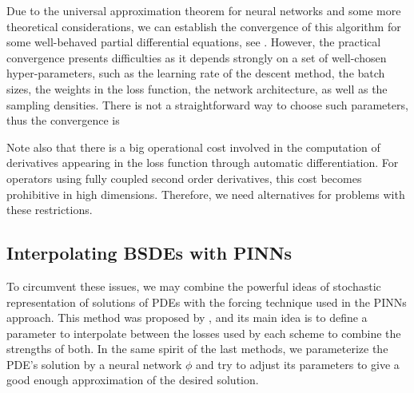 Due to the universal approximation theorem for neural networks and some more theoretical considerations, we can establish the convergence of this algorithm for some well-behaved partial differential equations, see \cite{sirignano_dgm_2018}. However, the practical convergence presents difficulties as it depends strongly on a set of well-chosen hyper-parameters, such as the learning rate of the descent method, the batch sizes, the weights in the loss function, the network architecture, as well as the sampling densities. There is not a straightforward way to choose such parameters, thus the convergence is 

Note also that there is a big operational cost involved in the computation of derivatives appearing in the loss function through automatic differentiation. For operators using fully coupled second order derivatives, this cost becomes prohibitive in high dimensions. Therefore, we need alternatives for problems with these restrictions.
\subsection{Interpolating BSDEs with PINNs}
To circumvent these issues, we may combine the powerful ideas of stochastic representation of solutions of PDEs with the forcing technique used in the PINNs approach. This method was proposed by \cite{nusken_interpolating_2023}, and its main idea is to define a parameter to interpolate between the losses used by each scheme to combine the strengths of both. In the same spirit of the last methods, we parameterize the PDE's solution by a neural network $\phi$ and try to adjust its parameters to give a good enough approximation of the desired solution.

